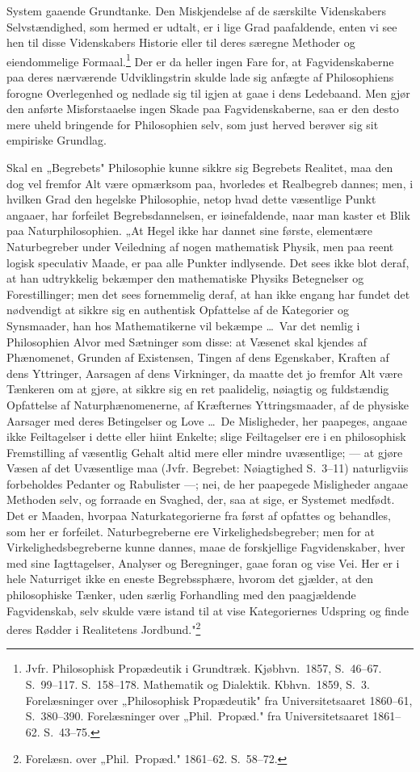 \documentclass[12pt]{book}
\begin{document}
System gaaende Grundtanke. Den Miskjendelse af de særskilte Videnskabers
Selvstændighed, som hermed er udtalt, er i lige Grad paafaldende, enten vi see hen
til disse Videnskabers Historie eller til deres særegne Methoder og eiendommelige
Formaal.\footnote{Jvfr. Philosophisk Propædeutik i Grundtræk. Kjøbhvn.\ 1857, S.~46--67.
S.~99--117. S.~158--178. Mathematik og Dialektik. Kbhvn.\ 1859, S.~3. Forelæsninger
over „Philosophisk Propædeutik" fra Universitetsaaret 1860--61, S.~380--390.
Forelæsninger over „Phil.\ Propæd." fra Universitetsaaret 1861--62. S.~43--75.} Der
er da heller ingen Fare for, at Fagvidenskaberne paa deres nærværende
Udviklingstrin skulde lade sig anfægte af Philosophiens forogne Overlegenhed og
nedlade sig til igjen at gaae i dens Ledebaand. Men gjør den anførte
Misforstaaelse ingen Skade paa Fagvidenskaberne, saa er den desto mere uheld%
bringende for Philosophien selv, som just herved berøver sig sit empiriske
Grundlag.

Skal en „Begrebets" Philosophie kunne sikkre sig Begrebets Realitet, maa den dog
vel fremfor Alt være opmærksom paa, hvorledes et Realbegreb dannes; men, i hvilken
Grad den hegelske Philosophie, netop hvad dette væsentlige Punkt angaaer, har
forfeilet Begrebsdannelsen, er iøinefaldende, naar man kaster et Blik paa
Naturphilosophien. „At Hegel ikke har dannet sine første, elementære Naturbegreber
under Veiledning af nogen mathematisk Physik, men paa reent logisk speculativ
Maade, er paa alle Punkter indlysende. Det sees ikke blot deraf, at han udtrykkelig
bekæmper den mathematiske Physiks Betegnelser og Forestillinger; men det sees
fornemmelig deraf, at han ikke engang har fundet det nødvendigt at sikkre sig en
authentisk Opfattelse af de Kategorier og Synsmaader, han hos Mathematikerne vil
bekæmpe \dots\ Var det nemlig i Philosophien Alvor med Sætninger som disse: at
Væsenet skal kjendes af Phænomenet, Grunden af Existensen, Tingen af dens
Egenskaber, Kraften af dens Yttringer, Aarsagen af dens Virkninger, da maatte det
jo fremfor Alt være Tænkeren om at gjøre, at sikkre sig en ret paalidelig, nøiagtig
og fuldstændig Opfattelse af Naturphænomenerne, af Kræfternes Yttringsmaader, af de
physiske Aarsager med deres Betingelser og Love \dots\ De Misligheder, her
paapeges, angaae ikke Feiltagelser i dette eller hiint Enkelte; slige Feiltagelser
ere i en philosophisk Fremstilling af væsentlig Gehalt altid mere eller mindre
uvæsentlige; --- at gjøre Væsen af det Uvæsentlige maa (Jvfr. Begrebet: Nøiagtighed
S.~3--11) naturligviis forbeholdes Pedanter og Rabulister ---; nei, de her
paapegede Misligheder angaae Methoden selv, og forraade en Svaghed, der, saa at
sige, er Systemet medfødt. Det er Maaden, hvorpaa Naturkategorierne fra først af
opfattes og behandles, som
her er forfeilet. Naturbegreberne ere Virkelighedsbegreber; men for at
Virkelighedsbegreberne kunne dannes, maae de forskjellige Fagvidenskaber, hver med
sine Iagttagelser, Analyser og Beregninger, gaae foran og vise Vei. Her er i hele
Naturriget ikke en eneste Begrebssphære, hvorom det gjælder, at den philosophiske
Tænker, uden særlig Forhandling med den paagjældende Fagvidenskab, selv skulde være
istand til at vise Kategoriernes Udspring og finde deres Rødder i Realitetens
Jordbund."\footnote{Forelæsn. over „Phil.\ Propæd." 1861--62. S.~58--72.}
\end{document}

